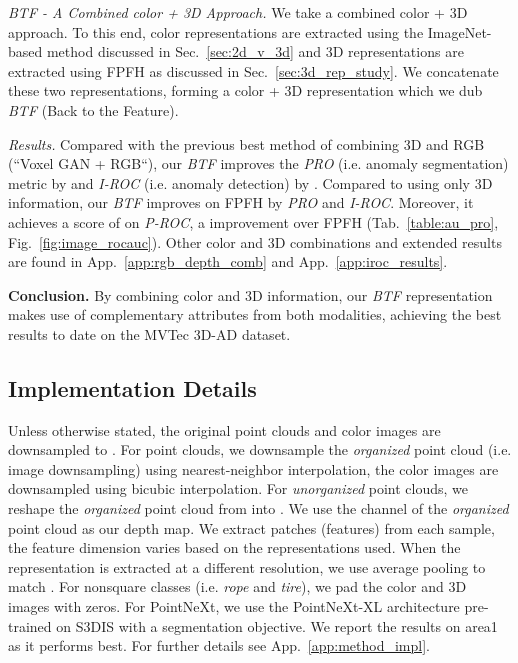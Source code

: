 \documentclass{article}
\begin{document}
\textit{BTF - A Combined color + 3D Approach.}
\label{sec:2d_plus_3d}
We take a combined color + 3D approach. To this end, color representations are extracted using the ImageNet-based method discussed in Sec.~\ref{sec:2d_v_3d} and 3D representations are extracted using FPFH as discussed in Sec.~\ref{sec:3d_rep_study}. We concatenate these two representations, forming a color + 3D representation which we dub \textit{BTF} (Back to the Feature).

\noindent \textit{Results.} Compared with the previous best method of combining 3D and RGB (``Voxel GAN + RGB``), our \textit{BTF} improves the \textit{PRO} (i.e. anomaly segmentation) metric by  and \textit{I-ROC} (i.e. anomaly detection) by . Compared to using only 3D information, our \textit{BTF} improves on FPFH by   \textit{PRO} and  \textit{I-ROC}. Moreover, it achieves a score of  on \textit{P-ROC}, a  improvement over FPFH (Tab.~\ref{table:au_pro}, Fig.~\ref{fig:image_rocauc}). Other color and 3D combinations and extended results are found in App.~\ref{app:rgb_depth_comb} and App.~\ref{app:iroc_results}.

\noindent \textbf{Conclusion.} By combining color and 3D information, our \textit{BTF} representation makes use of complementary attributes from both modalities, achieving the best results to date on the MVTec 3D-AD dataset.








\subsection{Implementation Details}
\label{sec:impl_details}
Unless otherwise stated, the original point clouds and color images are downsampled to . For point clouds, we downsample the \textit{organized} point cloud (i.e. image downsampling) using nearest-neighbor interpolation, the color images are downsampled using bicubic interpolation. For \textit{unorganized} point clouds, we reshape the \textit{organized} point cloud from  into . We use the  channel of the \textit{organized} point cloud as our depth map. We extract  patches (features) from each sample, the feature dimension varies based on the representations used. When the representation is extracted at a different resolution, we use average pooling to match . For nonsquare classes (i.e. \textit{rope} and \textit{tire}), we pad the color and 3D images with zeros. For PointNeXt, we use the PointNeXt-XL architecture pre-trained on S3DIS \cite{s3dis} with a segmentation objective. We report the results on area1 as it performs best. For further details see App.~\ref{app:method_impl}. 
 
\end{document}
